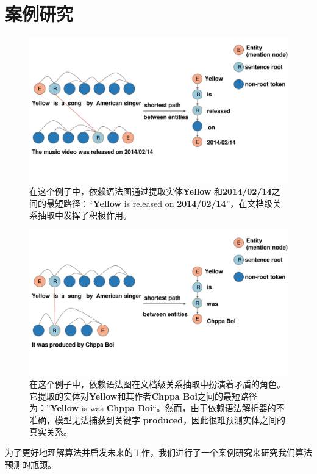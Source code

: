 \documentclass[bachelor]{thesis-uestc}
\begin{document}
\section{案例研究}
\begin{figure}[t]
    \includegraphics[width=\linewidth]{misc/case1.pdf}
    \caption{ 在这个例子中，依赖语法图通过提取实体\textbf{Yellow} 和\textbf{2014/02/14}之间的最短路径：“\textbf{Yellow} is released on \textbf{2014/02/14}”，在文档级关系抽取中发挥了积极作用。
    } 
\end{figure}\label{fig_casea}
\begin{figure}[t]
    \includegraphics[width=\linewidth]{misc/case2.pdf}
    \caption{在这个例子中，依赖语法图在文档级关系抽取中扮演着矛盾的角色。它提取的实体对\textbf{Yellow}和其作者\textbf{Chppa Boi}之间的最短路径为：”\textbf{Yellow} is was \textbf{Chppa Boi}“。然而，由于依赖语法解析器的不准确，模型无法捕获到关键字 \textbf{produced}，因此很难预测实体之间的真实关系。}
\end{figure}\label{fig_caseb}

为了更好地理解算法并启发未来的工作，我们进行了一个案例研究来研究我们算法预测的瓶颈。\par
\end{document}
